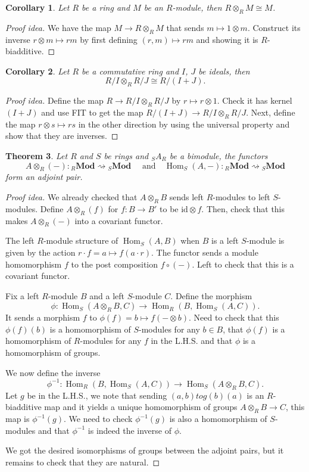 \documentclass[paper=a4, fontsize=12pt]{scrartcl} %
\newtheorem{thm}{Theorem}
\newtheorem{cor}[thm]{Corollary}
\theoremstyle{definition}
\theoremstyle{remark}
\DeclareMathOperator{\Hom}{Hom}
\begin{document}
\begin{cor}
	Let $R$ be a ring and $M$ be an $R$-module, then $R \otimes_R M \cong M$.
\end{cor}
\begin{proof}[Proof idea]
	We have the map $M \rightarrow R\otimes_R M$ that sends $m \mapsto 1 \otimes m$. Construct its inverse $r \otimes m \mapsto rm$ by first defining $(r,m) \mapsto rm$ and showing it is $R$-biadditive.
\end{proof}
\begin{cor}
	Let $R$ be a commutative ring and $I$, $J$ be ideals, then 
	$$R/I \otimes_R R/J \cong R/(I+J).$$
\end{cor}
\begin{proof}[Proof idea]
	Define the map $R \rightarrow R/I \otimes_R R/J$ by $r \mapsto r \otimes 1$. Check it has kernel $(I+J)$ and use FIT to get the map $R/(I+J) \rightarrow R/I \otimes_R R/J$. Next, define the map $r \otimes s \mapsto rs$ in the other direction by using the universal property and show that they are inverses.
\end{proof}
\begin{thm}
	Let $R$ and $S$ be rings and ${}_SA_R$ be a bimodule, the functors 
	$$A \otimes_R (-) : {}_R\textbf{Mod} \rightsquigarrow {}_S\textbf{Mod} \quad \text{ and} \quad \Hom_S(A, -): {}_R\textbf{Mod} \rightsquigarrow {}_S\textbf{Mod}$$
	form an adjoint pair.
\end{thm}
\begin{proof}[Proof idea]
	We already checked that $A \otimes_R B$ sends left $R$-modules to left $S$-modules. Define $A \otimes_R (f)$ for $f:B\rightarrow B'$ to be $\text{id} \otimes f$. Then, check that this makes $A \otimes_R(-)$ into a covariant functor.
	
	The left $R$-module structure of $\Hom_S(A,B)$ when $B$ is a left $S$-module is given by the action $r\cdot f = a \mapsto f(a\cdot r)$. The functor sends a module homomorphism $f$ to the post composition $f\circ (-)$. Left to check that this is a covariant functor.
	
	Fix a left $R$-module $B$ and a left $S$-module $C$. Define the morphism $$\phi: \Hom_S(A \otimes_R B, C) \rightarrow \Hom_R(B, \Hom_S(A,C)).$$
	It sends a morphism $f$ to $\phi(f) = b \mapsto f(-\otimes b)$. Need to check that this $\phi(f)(b)$ is a homomorphism of $S$-modules for any $b \in B$, that $\phi(f)$ is a homomorphism of $R$-modules for any $f$ in the L.H.S. and that $\phi$ is a homomorphism of groups.
	
	We now define the inverse $$\phi^{-1}:\Hom_R(B, \Hom_S(A,C))  \rightarrow \Hom_S(A \otimes_R B, C).$$ Let $g$ be in the L.H.S., we note that sending $(a,b) to g(b)(a)$ is an $R$-biadditive map and it yields a unique homomorphism of groups $A \otimes_R B \rightarrow C$, this map is $\phi^{-1}(g)$. We need to check $\phi^{-1}(g)$ is also a homomorphism of $S$-modules and that $\phi^{-1}$ is indeed the inverse of $\phi$.
	
	We got the desired isomorphisms of groups between the adjoint pairs, but it remains to check that they are natural.
\end{proof}
\end{document}
